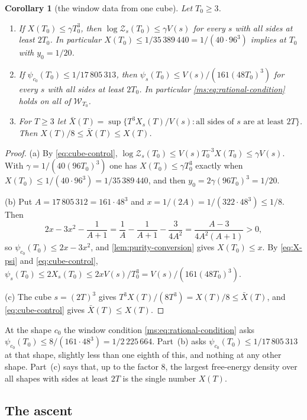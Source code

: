 \documentclass[11pt,a4paper]{amsart}
\newtheorem{corollary}[theorem]{Corollary}
\theoremstyle{definition}
\theoremstyle{remark}
\numberwithin{equation}{section}
\newcommand{\Wwin}{\mathcal{W}}      %
\newcommand{\TT}{\mathbb{T}}               %
\newcommand{\Zc}{\mathcal{Z}}              %
\newcommand{\Zs}[2]{\Zc_{#1}(#2)}          %
\newcommand{\XT}[2]{X_{#1}(#2)}            %
\newcommand{\psiT}[2]{\psi_{#1}(#2)}       %
\newcommand{\Vol}[1]{V(#1)}                %
\newcommand{\cube}[1]{(2#1)^3}             %
\newcommand{\Bstar}{\text{\upshape(B$^{*}$)}}       %
\begin{document}
\begin{corollary}[the window data from one cube]\label{cor:window-datum}
Let $T_0\ge3$.
\begin{enumerate}[label=(\alph*)]
\item If $X(T_0)\le\gamma T_0^3$, then $\log\Zs{s}{T_0}\le\gamma\Vol{s}$ for every $s$ with all sides at least $2T_0$. In particular $X(T_0)\le1/35\,389\,440=1/(40\cdot96^3)$ implies \Bstar{} at $T_0$ with $y_0=1/20$.
\item If $\psiT{c_0}{T_0}\le1/17\,805\,313$, then $\psiT{s}{T_0}\le\Vol{s}/(161(48T_0)^3)$ for every $s$ with all sides at least $2T_0$. In particular \eqref{ms:eq:rational-condition} holds on all of $\Wwin_{T_0}$.
\item For $T\ge3$ let $\bar X(T)=\sup\{T^3\XT{s}{T}/\Vol{s}:\text{all sides of }s\text{ are at least }2T\}$. Then $X(T)/8\le\bar X(T)\le X(T)$.
\end{enumerate}
\end{corollary}

\begin{proof}
(a) By \eqref{eq:cube-control}, $\log\Zs{s}{T_0}\le\Vol{s}T_0^{-3}X(T_0)\le\gamma\Vol{s}$. With $\gamma=1/(40(96T_0)^3)$ one has $X(T_0)\le\gamma T_0^3$ exactly when $X(T_0)\le1/(40\cdot96^3)=1/35\,389\,440$, and then $y_0=2\gamma(96T_0)^3=1/20$.

(b) Put $A=17\,805\,312=161\cdot48^3$ and $x=1/(2A)=1/(322\cdot48^3)\le1/8$. Then
\[
2x-3x^2-\frac1{A+1}=\frac1A-\frac1{A+1}-\frac3{4A^2}=\frac{A-3}{4A^2(A+1)}>0,
\]
so $\psiT{c_0}{T_0}\le2x-3x^2$, and \cref{lem:purity-conversion} gives $X(T_0)\le x$. By \eqref{eq:X-psi} and \eqref{eq:cube-control}, $\psiT{s}{T_0}\le2\XT{s}{T_0}\le2x\Vol{s}/T_0^3=\Vol{s}/(161(48T_0)^3)$.

(c) The cube $s=\cube{T}$ gives $T^3X(T)/(8T^3)=X(T)/8\le\bar X(T)$, and \eqref{eq:cube-control} gives $\bar X(T)\le X(T)$.
\end{proof}

At the shape $c_0$ the window condition \eqref{ms:eq:rational-condition} asks $\psiT{c_0}{T_0}\le8/(161\cdot48^3)=1/2\,225\,664$. Part~(b) asks $\psiT{c_0}{T_0}\le1/17\,805\,313$ at that shape, slightly less than one eighth of this, and nothing at any other shape. Part~(c) says that, up to the factor $8$, the largest free-energy density over all shapes with sides at least $2T$ is the single number $X(T)$.

\subsection{The ascent}
\end{document}
